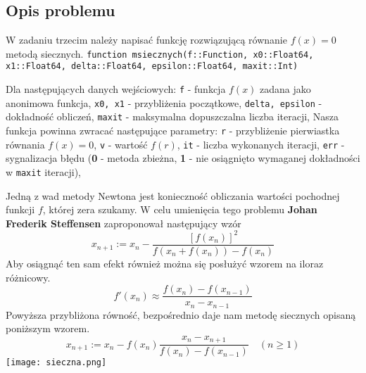 \documentclass{article}
\begin{document}
\begin{center}
    \subsection{Opis problemu}
    \large W zadaniu trzecim należy napisać funkcję rozwiązującą równanie \(f(x) = 0\) metodą siecznych. \newline
    \texttt{function msiecznych(f::Function, x0::Float64, x1::Float64, delta::Float64, epsilon::Float64, maxit::Int)} \newline
    \begin{flushleft}
       Dla następujących danych wejściowych: \newline
       \texttt{f} - funkcja \(f(x)\) zadana jako anonimowa funkcja, \newline
       \texttt{x0, x1} - przybliżenia początkowe, \newline
       \texttt{delta, epsilon} - dokładność obliczeń, \newline
       \texttt{maxit} - maksymalna dopuszczalna liczba iteracji, \newline
       \newline
       Nasza funkcja powinna zwracać następujące parametry: \newline
       \texttt{r} - przybliżenie pierwiastka równania \(f(x) = 0\), \newline
       \texttt{v} - wartość \(f(r)\), \newline
       \texttt{it} - liczba wykonanych iteracji, \newline
       \texttt{err} - sygnalizacja błędu (\textbf{0} - metoda zbieżna, \textbf{1} - nie osiągnięto wymaganej dokładności w \texttt{maxit} iteracji), \newline
    \end{flushleft}
    Jedną z wad metody Newtona jest konieczność obliczania wartości pochodnej funkcji \(f\), której zera szukamy.
    W celu umienięcia tego problemu \textbf{Johan Frederik Steffensen} zaproponował następujący wzór
    \[x_{n+1} := x_{n} - \frac{[f(x_{n})]^2}{f(x_{n} + f(x_{n})) - f(x_{n})}\] \newline
    Aby osiągnąć ten sam efekt również można się posłużyć wzorem na iloraz różnicowy.
    \[f'(x_{n}) \approx \frac{f(x_{n}) - f(x_{n-1})}{x_{n} - x_{n-1}}\] \newline
    Powyższa przybliżona równość, bezpośrednio daje nam metodę siecznych opisaną poniższym wzorem.
    \[x_{n+1} := x_{n} - f(x_{n})\frac{x_{n} - x_{n+1}}{f(x_{n}) - f(x_{n-1})} \quad (n \geqslant 1)\]
    \texttt{[image: sieczna.png]}

\end{center}
\end{document}
